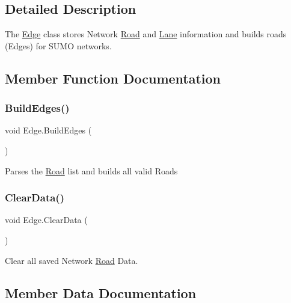 \subsection{Detailed Description}
The \mbox{\hyperlink{class_edge}{Edge}} class stores Network \mbox{\hyperlink{struct_road}{Road}} and \mbox{\hyperlink{struct_lane}{Lane}} information and builds roads (Edges) for S\+U\+MO networks. 



\subsection{Member Function Documentation}
\mbox{\label{class_edge_af671777176dc831d8a08e49f032fc763}} 
\subsubsection{\texorpdfstring{BuildEdges()}{BuildEdges()}}
{\footnotesize\ttfamily void Edge.\+Build\+Edges (\begin{DoxyParamCaption}{ }\end{DoxyParamCaption})}



Parses the \mbox{\hyperlink{struct_road}{Road}} list and builds all valid Roads 

\mbox{\label{class_edge_a2ec64470c2a869696dfba6b5fdd9cf0b}} 
\subsubsection{\texorpdfstring{ClearData()}{ClearData()}}
{\footnotesize\ttfamily void Edge.\+Clear\+Data (\begin{DoxyParamCaption}{ }\end{DoxyParamCaption})}



Clear all saved Network \mbox{\hyperlink{struct_road}{Road}} Data. 



\subsection{Member Data Documentation}
\mbox{\label{class_edge_abce1274185524bbf90f49b8214130fd1}} 
